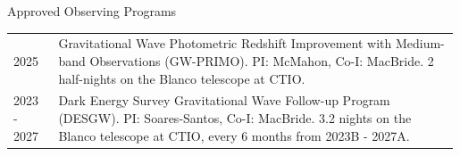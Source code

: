 \begin{rSection}{Approved Observing Programs}
    \setlength{\extrarowheight}{3pt}
\begin{longtable}{p{0.1\linewidth}p{0.89\linewidth}}
        2025 & Gravitational Wave Photometric Redshift Improvement with Medium-band Observations (GW-PRIMO). PI: McMahon, Co-I: MacBride. 2 half-nights on the Blanco telescope at CTIO. \\
        2023 - 2027 & Dark Energy Survey Gravitational Wave Follow-up Program (DESGW). PI: Soares-Santos, Co-I: MacBride. 3.2 nights on the Blanco telescope at CTIO, every 6 months from 2023B - 2027A.
    \end{longtable}
\end{rSection}
